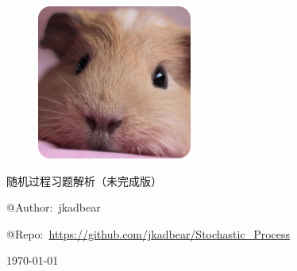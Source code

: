 \pagecolor{VioletBlue}
\color{white}
\begin{titlepage}

    \begin{figure}[ht]
    \centering
    \includegraphics{resource/mascot.png}
    \end{figure}

    \begin{center}
        {\Huge 随机过程习题解析（未完成版）}
    \end{center}

    \vfill

    \begin{center}
        {\Large @Author:~jkadbear}
    \end{center}

    \begin{center}
        {\Large @Repo:~\url{https://github.com/jkadbear/Stochastic_Process}}
    \end{center}

    \begin{center}
        {\Large \today}
    \end{center}

    \vspace{5mm}

\end{titlepage}
\pagecolor{white}
\color{black}
